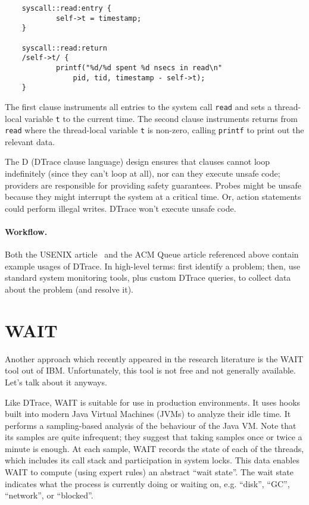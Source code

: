 {\scriptsize \begin{verbatim}
    syscall::read:entry {
            self->t = timestamp;
    }

    syscall::read:return
    /self->t/ {
            printf("%d/%d spent %d nsecs in read\n"
                pid, tid, timestamp - self->t);
    }
    \end{verbatim}
}

The first clause instruments all entries to the system call {\tt read}
and sets a thread-local variable {\tt t} to the current time. The
second clause instruments returns from {\tt read} where the
thread-local variable {\tt t} is non-zero, calling {\tt printf} to print out
the relevant data.

The D (DTrace clause language) design ensures that clauses cannot loop indefinitely
(since they can't loop at all), nor can they execute unsafe code;
providers are responsible for providing safety guarantees. Probes
might be unsafe because they might interrupt the system at a critical
time. Or, action statements could perform illegal writes. DTrace won't 
execute unsafe code.

\paragraph{Workflow.} Both the USENIX article~\cite{Cantrill:2004:DIP:1247415.1247417} and the
ACM Queue article referenced above contain example usages of DTrace.
In high-level terms: first identify a problem; then, use
standard system monitoring tools, plus custom DTrace queries,
to collect data about the problem (and resolve it).

\section*{WAIT}
Another approach which recently appeared in the research literature is
the WAIT tool out of IBM. Unfortunately, this tool is not free and not
generally available. Let's talk about it anyways.

Like DTrace, WAIT is suitable for use in production environments. It
uses hooks built into modern Java Virtual Machines (JVMs) to analyze
their idle time. It performs a sampling-based analysis of the
behaviour of the Java VM. Note that its samples are quite infrequent;
they suggest that taking samples once or twice a minute is enough.  At
each sample, WAIT records the state of each of the threads, which
includes its call stack and participation in system locks. This data
enables WAIT to compute (using expert rules) an abstract ``wait
state''.  The wait state indicates what the process is currently doing
or waiting on, e.g. ``disk'', ``GC'', ``network'', or ``blocked''.

